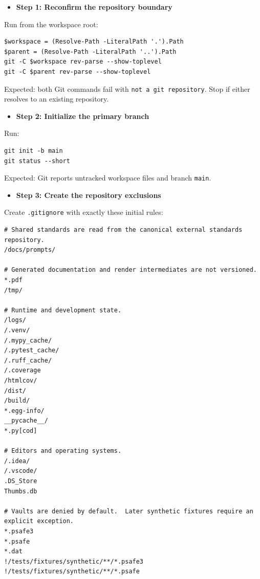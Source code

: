 \documentclass[
  letterpaper,
]{article}
\newcommand{\passthrough}[1]{#1}
\providecommand{\tightlist}{%
  \setlength{\itemsep}{0pt}\setlength{\parskip}{0pt}}
\begin{document}
\begin{itemize}
\tightlist
\item[$\boxtimes$]
  \textbf{Step 1: Reconfirm the repository boundary}
\end{itemize}

Run from the workspace root:

\begin{lstlisting}
$workspace = (Resolve-Path -LiteralPath '.').Path
$parent = (Resolve-Path -LiteralPath '..').Path
git -C $workspace rev-parse --show-toplevel
git -C $parent rev-parse --show-toplevel
\end{lstlisting}

Expected: both Git commands fail with \passthrough{\lstinline!not a git repository!}. Stop if either resolves to an
existing repository.

\begin{itemize}
\tightlist
\item[$\boxtimes$]
  \textbf{Step 2: Initialize the primary branch}
\end{itemize}

Run:

\begin{lstlisting}
git init -b main
git status --short
\end{lstlisting}

Expected: Git reports untracked workspace files and branch \passthrough{\lstinline!main!}.

\begin{itemize}
\tightlist
\item[$\boxtimes$]
  \textbf{Step 3: Create the repository exclusions}
\end{itemize}

Create \nolinkurl{.gitignore} with exactly these initial rules:

\begin{lstlisting}
# Shared standards are read from the canonical external standards repository.
/docs/prompts/

# Generated documentation and render intermediates are not versioned.
*.pdf
/tmp/

# Runtime and development state.
/logs/
/.venv/
/.mypy_cache/
/.pytest_cache/
/.ruff_cache/
/.coverage
/htmlcov/
/dist/
/build/
*.egg-info/
__pycache__/
*.py[cod]

# Editors and operating systems.
/.idea/
/.vscode/
.DS_Store
Thumbs.db

# Vaults are denied by default.  Later synthetic fixtures require an explicit exception.
*.psafe3
*.psafe
*.dat
!/tests/fixtures/synthetic/**/*.psafe3
!/tests/fixtures/synthetic/**/*.psafe
\end{lstlisting}
\end{document}
